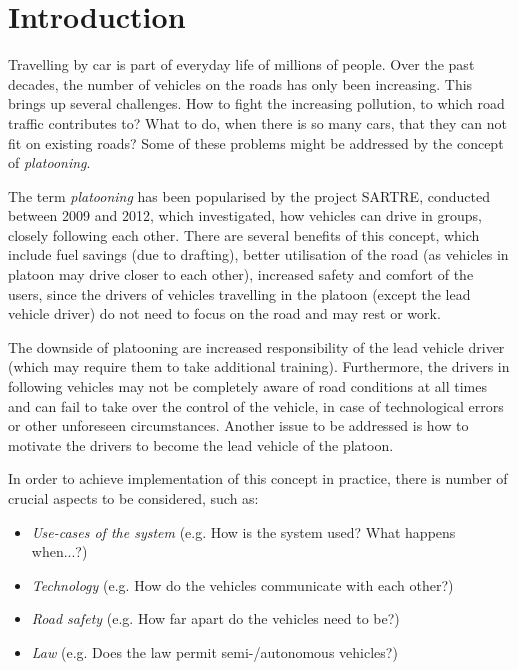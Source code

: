 
\section{Introduction}


Travelling by car is part of everyday life of millions of people. Over the past decades, the number of vehicles on the roads has only been increasing. This brings up several challenges. How to fight the increasing pollution, to which road traffic contributes to? What to do, when there is so many cars, that they can not fit on existing roads? Some of these problems might be addressed by the concept of \emph{platooning}.\par

The term \emph{platooning} has been popularised by the project SARTRE, conducted between 2009 and 2012, which investigated, how vehicles can drive in groups, closely following each other. There are several benefits of this concept, which include fuel savings (due to drafting\footnotemark[1]), better utilisation of the road (as vehicles in platoon may drive closer to each other), increased safety and comfort of the users, since the drivers of vehicles travelling in the platoon (except the lead vehicle driver) do not need to focus on the road and may rest or work.\par


The downside of platooning are increased responsibility of the lead vehicle driver (which may require them to take additional training). Furthermore, the drivers in following vehicles may not be completely aware of road conditions at all times and can fail to take over the control of the vehicle, in case of technological errors or other unforeseen circumstances. Another issue to be addressed is how to motivate the drivers to become the lead vehicle of the platoon.

In order to achieve implementation of this concept in practice, there is number of crucial aspects to be considered, such as:
\begin{itemize}[noitemsep]
    \item \emph{Use-cases of the system} (e.g. How is the system used? What happens when...?)
    \item \emph{Technology} (e.g. How do the vehicles communicate with each other?)
    \item \emph{Road safety} (e.g. How far apart do the vehicles need to be?)
    \item \emph{Law} (e.g. Does the law permit semi-/autonomous vehicles?)
\end{itemize} \par

